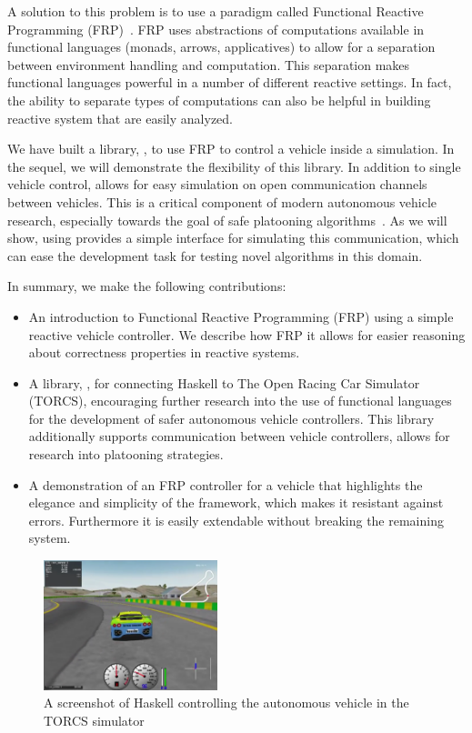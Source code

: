 A solution to this problem is to use a paradigm called Functional Reactive Programming (FRP)~\cite{hudak2003arrows,hudak2000haskell}.
FRP uses abstractions of computations available in functional languages (\eg monads, arrows, applicatives) to allow for a separation between environment handling and computation.
This separation makes functional languages powerful in a number of different reactive settings.
In fact, the ability to separate types of computations can also be helpful in building reactive system that are easily analyzed.

We have built a library, \ourLib, to use FRP to control a vehicle inside a simulation.
In the sequel, we will demonstrate the flexibility of this library.
In addition to single vehicle control, \ourLib allows for easy simulation on open communication channels between vehicles.
This is a critical component of modern autonomous vehicle research, especially towards the goal of safe platooning algorithms~\cite{?}.
As we will show, using \ourLib provides a simple interface for simulating this communication, which can ease the development task for testing novel algorithms in this domain.

In summary, we make the following contributions:

\begin{itemize}
\item An introduction to Functional Reactive Programming (FRP) using a simple reactive vehicle controller. We describe how FRP it allows for easier reasoning about correctness properties in reactive systems.

\item A library, \ourLib, for connecting Haskell to The Open Racing Car Simulator (TORCS), encouraging further research into the use of functional languages for the development of safer autonomous vehicle controllers. This library additionally supports communication between vehicle controllers, allows for research into platooning strategies.

\item A demonstration of an FRP controller for a vehicle that highlights the elegance and simplicity of the framework,
   which makes it resistant against errors. Furthermore it is easily extendable without breaking the remaining system.

\end{itemize}

\begin{figure}[t]
\includegraphics[width=0.45\textwidth]{figs/racing.png}
\caption{A screenshot of Haskell controlling the autonomous vehicle in the TORCS simulator}
\label{fig:race}
\end{figure}
